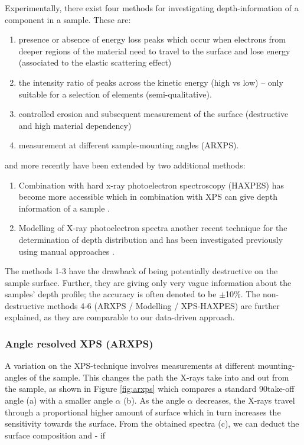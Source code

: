 Experimentally, there exist four methods for investigating depth-information of a component in a sample. These are:
\begin{enumerate}
    \item presence or absence of energy loss peaks which occur when electrons from deeper regions of the material need to travel to the surface and lose energy (associated to the elastic scattering effect)
    \item the intensity ratio of peaks across the kinetic energy (high vs low) – only suitable for a selection of elements (semi-qualitative).
    \item controlled erosion and subsequent measurement of the surface (destructive and high material dependency)
    \item measurement at different sample-mounting angles (ARXPS). \cite{moulder_handbook_1992} 
    \end{enumerate}
and more recently have been extended by two additional methods:
\begin{enumerate}[resume]
    \item Combination with hard x-ray photoelectron spectroscopy (HAXPES) has become more accessible which in combination with XPS can give depth information of a sample \cite{zborowski_improved_2022}.
    \item Modelling of X-ray photoelectron spectra another recent technique for the determination of depth distribution and has been investigated previously using manual approaches \cite{zborowski_comparison_2022}.

\end{enumerate}


The methods 1-3 have the drawback of being potentially destructive on the sample surface. Further, they are giving only very vague information about the samples’ depth profile; the accuracy is often denoted to be $\pm$10\%.
The non-destructive methods 4-6 (ARXPS / Modelling / XPS-HAXPES) are further explained, as they are comparable to our data-driven approach.

\subsubsection{Angle resolved XPS (ARXPS)}

A variation on the XPS-technique involves measurements at different mounting-angles of the sample.
This changes the path the X-rays take into and out from the sample, as shown in Figure \ref{fig:arxps} which compares a standard 90\textdegree  take-off angle (a) with a smaller angle $\alpha$ (b). As the angle $\alpha$ decreases, the X-rays travel through a proportional higher amount of surface which in turn increases the sensitivity towards the surface. From the obtained spectra (c), we can deduct the surface composition and - if 

